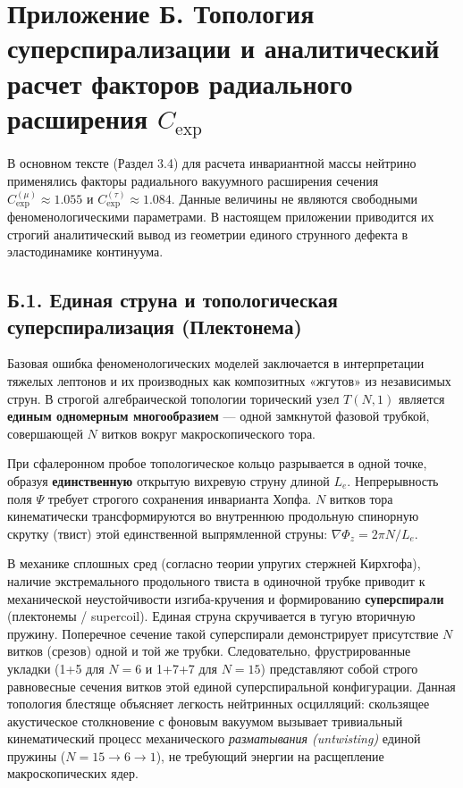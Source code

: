 \documentclass[11pt,a4paper]{article}
\begin{document}
\section*{Приложение Б. Топология суперспирализации и аналитический расчет факторов радиального расширения $C_{\text{exp}}$}

В основном тексте (Раздел 3.4) для расчета инвариантной массы нейтрино применялись факторы радиального вакуумного расширения сечения $C_{\text{exp}}^{(\mu)} \approx 1.055$ и $C_{\text{exp}}^{(\tau)} \approx 1.084$. Данные величины не являются свободными феноменологическими параметрами. В настоящем приложении приводится их строгий аналитический вывод из геометрии единого струнного дефекта в эластодинамике континуума.

\subsection*{Б.1. Единая струна и топологическая суперспирализация (Плектонема)}
Базовая ошибка феноменологических моделей заключается в интерпретации тяжелых лептонов и их производных как композитных «жгутов» из независимых струн. В строгой алгебраической топологии торический узел $T(N,1)$ является \textbf{единым одномерным многообразием} — одной замкнутой фазовой трубкой, совершающей $N$ витков вокруг макроскопического тора.

При сфалеронном пробое топологическое кольцо разрывается в одной точке, образуя \textbf{единственную} открытую вихревую струну длиной $L_e$. Непрерывность поля $\Psi$ требует строгого сохранения инварианта Хопфа. $N$ витков тора кинематически трансформируются во внутреннюю продольную спинорную скрутку (твист) этой единственной выпрямленной струны: $\nabla \Phi_z = 2\pi N / L_e$.

В механике сплошных сред (согласно теории упругих стержней Кирхгофа), наличие экстремального продольного твиста в одиночной трубке приводит к механической неустойчивости изгиба-кручения и формированию \textbf{суперспирали} (плектонемы / supercoil). Единая струна скручивается в тугую вторичную пружину. 
Поперечное сечение такой суперспирали демонстрирует присутствие $N$ витков (срезов) одной и той же трубки. Следовательно, фрустрированные укладки (1+5 для $N=6$ и 1+7+7 для $N=15$) представляют собой строго равновесные сечения витков этой единой суперспиральной конфигурации. Данная топология блестяще объясняет легкость нейтринных осцилляций: скользящее акустическое столкновение с фоновым вакуумом вызывает тривиальный кинематический процесс механического \textit{разматывания (untwisting)} единой пружины ($N=15 \to 6 \to 1$), не требующий энергии на расщепление макроскопических ядер.
\end{document}
